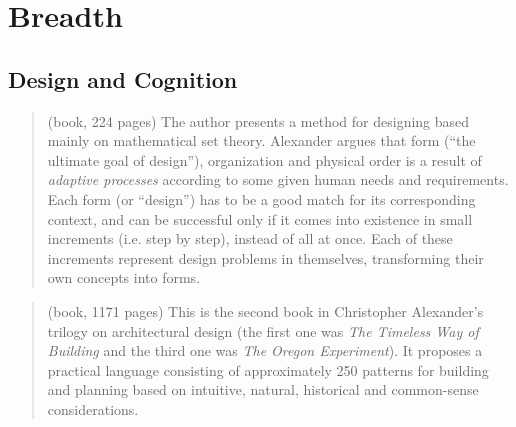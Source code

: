 
\clearpage
\section{Breadth}


\subsection{Design and Cognition}



		\begin{quote}
		\small
		(book, 224 pages) 
		The author presents a method for designing based mainly on mathematical set theory.
		Alexander argues that form (``the ultimate goal of design''), organization and physical order 
		is a result of {\em adaptive processes} according to some given human needs and requirements.
		Each form (or ``design'') has to be a good match for its corresponding context,
		and can be successful only if it comes into existence in small increments (i.e. step by step), 
		instead of all at once. Each of these increments represent design problems in themselves,
		transforming their own concepts into forms.
		\end{quote}

		\begin{quote}
		\small
		(book, 1171 pages) 
	    This is the second book in Christopher Alexander's trilogy on architectural design 
	    (the first one was {\em The Timeless Way of Building} and the third one was 
	    {\em The Oregon Experiment}). It proposes a practical language consisting of 
	    approximately 250 patterns for building and planning based on 
	    intuitive, natural, historical and common-sense considerations.
		\end{quote}

